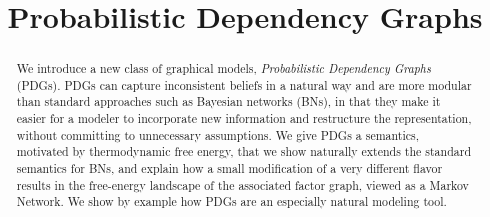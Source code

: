 \documentclass{article}
\title{Probabilistic Dependency Graphs}
\author{} %
\numberwithin{equation}{section}
\begin{document}
	\maketitle
	
	\begin{abstract}
	We introduce a new class of graphical models, \emph{Probabilistic Dependency
          Graphs} (PDGs). PDGs can capture inconsistent 
                beliefs in a natural way and are more modular than
                standard approaches such as Bayesian networks (BNs),
                in that they make it easier for a modeler to
                incorporate new information and restructure the
                representation, without committing to unnecessary
                assumptions.
            		We give PDGs a semantics, motivated by thermodynamic
                free energy, that we show naturally extends the
                standard semantics for BNs, and explain how a small
                modification of a very different flavor results in the
                free-energy landscape of the associated factor graph,
                viewed as a Markov Network. 
		We show by example how PDGs are an especially natural modeling tool.
	\end{abstract}
\end{document}
